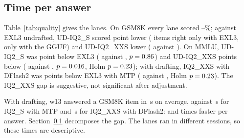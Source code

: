 \documentclass[11pt,letterpaper]{article}
\begin{document}
\subsection{Time per answer}
\label{sec:answers}
Table~\ref{tab:quality} gives the lanes. On GSM8K every lane scored
\PeQGsmMin--\PeQGsmMax\%; against EXL3 undrafted, UD-IQ2\_S scored
\PeQPGsmIsAbs{} point lower (\PeQPGsmIsTen{} items right only with EXL3,
\PeQPGsmIsOtt{} only with the GGUF) and UD-IQ2\_XXS \PeQPGsmIxxsAbs{} lower
(\PeQPGsmIxxsTen{} against \PeQPGsmIxxsOtt). On MMLU, UD-IQ2\_S was
\PeQPMmluIsAbs{} point below EXL3 (\PeQPMmluIsTen{} against \PeQPMmluIsOtt,
$p=0.86$) and UD-IQ2\_XXS \PeQPMmluIxxsAbs{} points below
(\PeQPMmluIxxsTen{} against \PeQPMmluIxxsOtt, $p=0.016$, Holm
$p=0.23$); with drafting, IQ2\_XXS with DFlash2 was
\PeQPMmluDfAbs{} points below EXL3 with MTP (\PeQPMmluDfTen{} against
\PeQPMmluDfOtt, Holm $p=0.23$). The IQ2\_XXS gap is suggestive, not
significant after adjustment.

With drafting, w13 answered a GSM8K item in \PeQGsmExlWWall\,s on average,
against \PeQGsmIsMtpWall\,s for IQ2\_S with MTP and \PeQGsmIxxsDfWall\,s for
IQ2\_XXS with DFlash2: \PeQRatioIsMtp{} and \PeQRatioIxxsDf{} times faster per
answer. Section~\ref{sec:answers} decomposes the gap. The lanes ran in
different sessions, so these times are descriptive.
\end{document}
